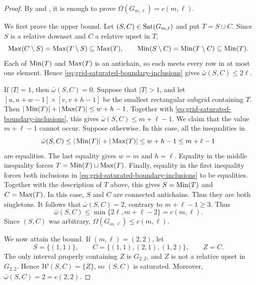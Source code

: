 \begin{proof}
By  and
, it is enough
to prove
$\Omega(G_{m,\ell})=c(m,\ell)$.

We first prove the upper bound.  Let
$(S,C)\in\operatorname{Sat}(G_{m,\ell})$ and put $T=S\cup C$.
Since $S$ is a relative downset and $C$ a relative upset in $T$,
\begin{equation}
\label{eq:grid-saturated-boundary-inclusions}
\operatorname{Max}(C\setminus S)
=
\operatorname{Max}(T\setminus S)
\subseteq
\operatorname{Max}(T),
\qquad
\operatorname{Min}(S\setminus C)
=
\operatorname{Min}(T\setminus C)
\subseteq
\operatorname{Min}(T).
\end{equation}
Each of $\operatorname{Min}(T)$ and $\operatorname{Max}(T)$ is an antichain, so each meets every
row in at most one element.  Hence
\eqref{eq:grid-saturated-boundary-inclusions} gives
$\bar\omega(S,C)\leq2\ell$.

If $|T|=1$, then $\bar\omega(S,C)=0$.  Suppose that $|T|>1$, and let
$[u,u+w-1]\times[v,v+h-1]$ be the smallest rectangular subgrid
containing $T$. 
Then $|\operatorname{Min}(T)|+|\operatorname{Max}(T)|\leq w+h-1$.
Together with \eqref{eq:grid-saturated-boundary-inclusions}, this gives $\bar\omega(S,C)\leq m+\ell-1$.
We claim that the value $m+\ell-1$ cannot occur.  
Suppose otherwise. In this case, all the inequalities in
\[
\bar\omega(S,C)
\leq
|\operatorname{Min}(T)|+|\operatorname{Max}(T)|
\leq
w+h-1
\leq
m+\ell-1
\]
are equalities.
The last equality gives $w=m$ and $h=\ell$.
Equality in the middle inequality forces
$T=\operatorname{Min}(T)\sqcup\operatorname{Max}(T)$.
Finally, equality in the first inequality forces both inclusions in
\eqref{eq:grid-saturated-boundary-inclusions} to be equalities.
Together with the description of $T$ above, this gives
$S=\operatorname{Min}(T)$ and $C=\operatorname{Max}(T)$.
In this case, $S$ and $C$ are connected antichains.
Thus they are both singletons.
It follows that
$\bar\omega(S,C)=2$, contrary to $m+\ell-1\geq3$.
Thus
\begin{equation}
\label{eq:grid-saturated-pair-upper-bound}
\bar\omega(S,C)
\leq
\min\{2\ell,m+\ell-2\}
=
c(m,\ell).
\end{equation}
Since $(S,C)$ was arbitrary,
$\Omega(G_{m,\ell})\leq c(m,\ell)$.

We now attain the bound.
If $(m,\ell)=(2,2)$, let
\begin{equation}
\label{eq:grid-two-by-two-saturated-pair}
S=\{(1,1)\},
\qquad
C=\{(1,1),(2,1),(1,2)\},
\qquad 
Z=C.
\end{equation}
The only interval properly containing $Z$ is $G_{2,2}$, and $Z$ is
not a relative upset in $G_{2,2}$.  Hence
$\mathcal W(S,C)=\{Z\}$, so $(S,C)$ is saturated.  Moreover,
$\bar\omega(S,C)=2=c(2,2)$.



\end{proof}
